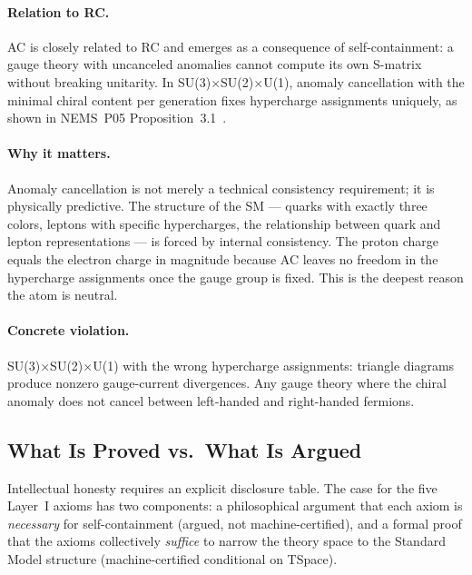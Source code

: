 \documentclass[11pt,openany]{book}
\theoremstyle{remark}
\begin{document}
\paragraph{Relation to RC.}
AC is closely related to RC and emerges as a consequence of self-containment: a gauge
theory with uncanceled anomalies cannot compute its own S-matrix without breaking
unitarity. In SU(3)$\times$SU(2)$\times$U(1), anomaly cancellation with the minimal
chiral content per generation fixes hypercharge assignments uniquely, as shown in
NEMS~P05 Proposition~3.1~\cite{SpivackNEMS05}.

\paragraph{Why it matters.}
Anomaly cancellation is not merely a technical consistency requirement; it is
physically predictive. The structure of the SM --- quarks with exactly three colors,
leptons with specific hypercharges, the relationship between quark and lepton
representations --- is forced by internal consistency. The proton charge equals the
electron charge in magnitude because AC leaves no freedom in the hypercharge
assignments once the gauge group is fixed. This is the deepest reason the atom is
neutral.

\paragraph{Concrete violation.}
SU(3)$\times$SU(2)$\times$U(1) with the wrong hypercharge assignments: triangle
diagrams produce nonzero gauge-current divergences. Any gauge theory where the
chiral anomaly does not cancel between left-handed and right-handed fermions.

\subsection*{What Is Proved vs.\ What Is Argued}

Intellectual honesty requires an explicit disclosure table. The case for the five
Layer~I axioms has two components: a philosophical argument that each axiom is
\emph{necessary} for self-containment (argued, not machine-certified), and a formal
proof that the axioms collectively \emph{suffice} to narrow the theory space to the
Standard Model structure (machine-certified conditional on TSpace).
\end{document}
